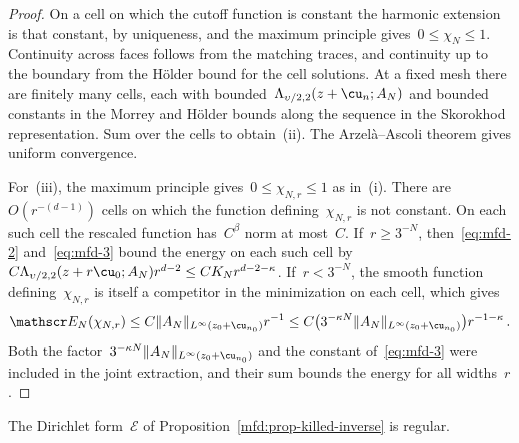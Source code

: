 \documentclass[11pt]{amsart}
\begin{document}
\begin{proof}
On a cell on which the cutoff function is constant the harmonic extension is that constant, by uniqueness, and the maximum principle gives~$0\leq\chi_N\leq1$. Continuity across faces follows from the matching traces, and continuity up to the boundary from the H\"older bound for the cell solutions. At a fixed mesh there are finitely many cells, each with bounded~$\Lambda_{\upsilon/2,2}(z+\cu_n;A_N)$ and bounded constants in the Morrey and H\"older bounds along the sequence in the Skorokhod representation. Sum over the cells to obtain~(ii). The Arzel\`a--Ascoli theorem gives uniform convergence.

\smallskip

For~(iii), the maximum principle gives~$0\leq\chi_{N,r}\leq1$ as in~(i). There are~$O(r^{-(d-1)})$ cells on which the function defining~$\chi_{N,r}$ is not constant. On each such cell the rescaled function has~$C^\beta$ norm at most~$C$. If~$r\geq3^{-N}$, then~\eqref{eq:mfd-2} and~\eqref{eq:mfd-3} bound the energy on each such cell by~$C\Lambda_{\upsilon/2,2}(z+r\cu_0;A_N)r^{d-2}\leq CK_Nr^{d-2-\kappa}$. If~$r<3^{-N}$, the smooth function defining~$\chi_{N,r}$ is itself a competitor in the minimization on each cell, which gives
\begin{equation*}
	\mathscr E_N(\chi_{N,r})\leq C\|A_N\|_{L^\infty(z_0+\cu_{n_0})}r^{-1}
	\leq C\bigl(3^{-\kappa N}\|A_N\|_{L^\infty(z_0+\cu_{n_0})}\bigr)r^{-1-\kappa}\,.
\end{equation*}
Both the factor~$3^{-\kappa N}\|A_N\|_{L^\infty(z_0+\cu_{n_0})}$ and the constant of~\eqref{eq:mfd-3} were included in the joint extraction, and their sum bounds the energy for all widths~$r$.
\end{proof}

\begin{proposition}[Regularity]
\label{mfd:prop-regularity}
The Dirichlet form~$\mathscr E$ of Proposition~\ref{mfd:prop-killed-inverse} is regular.
\end{proposition}
\end{document}
